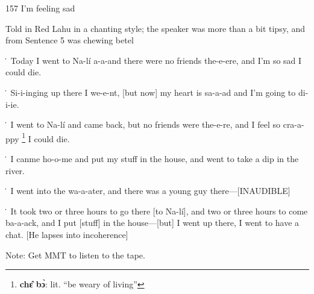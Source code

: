 
157 I'm feeling sad

Told in Red Lahu in a chanting style; the speaker was more than a bit tipsy, and
from Sentence 5 was chewing betel

\. Today I went to Na-lí a-a-and there were no friends the-e-ere, and I'm so sad
I could die.

\. Si-i-inging up there I we-e-nt, [but now] my heart is sa-a-ad and I'm going
to di-i-ie.

\. I went to Na-lí and came back, but no friends were the-e-re, and I feel so
cra-a-ppy \footnote{\textbf{chɛ̂ bɔ̀}: lit. ``be weary of living''} I could die.

\. I canme ho-o-me and put my stuff in the house, and went to take a dip in the
river.

\. I went into the wa-a-ater, and there was a young guy there---[INAUDIBLE]

\. It took two or three hours to go there [to Na-lí], and two or three hours to
come ba-a-ack, and I put [stuff] in the house---[but] I went up there, I went to
have a chat. [He lapses into incoherence]

Note: Get MMT to listen to the tape.

